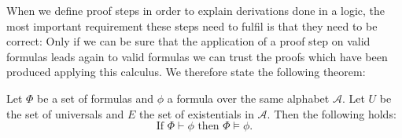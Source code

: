 When we define proof steps in order to explain derivations done in a logic, the most important requirement these steps need to fulfil is that they need to be correct: Only 
if we can be sure that the application of a proof step on valid formulas leads again to valid formulas we can trust the proofs which have been produced applying this calculus.
We therefore state the following theorem:

\begin{theorem}\label{correctness}
Let $\Phi$ be a set of \nthree formulas  and $\phi$ a formula over the same \nthree alphabet $\mathcal{A}$. Let $U$ be the set of universals and $E$ the set of existentials in $\mathcal{A}$. 
Then the following holds:
\[ \text{If } \Phi \vdash \phi \text{ then } \Phi \models \phi.\]
\end{theorem}



